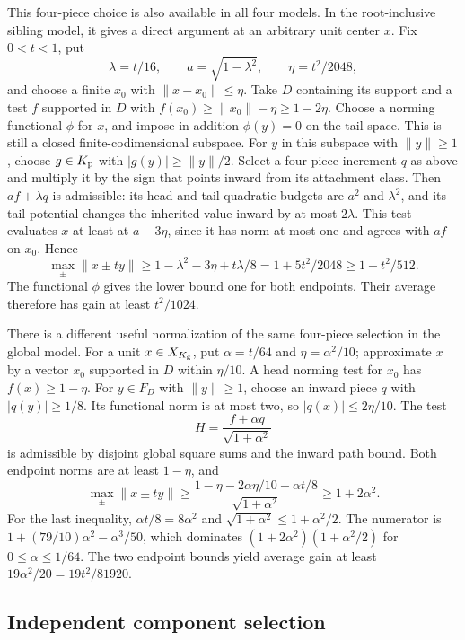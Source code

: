 This four-piece choice is also available in all four models. In the
root-inclusive sibling model, it gives a direct argument at
an arbitrary unit center $x$. Fix $0<t<1$, put
\[
 \lambda=t/16,\qquad a=\sqrt{1-\lambda^2},\qquad
 \eta=t^2/2048,
\]
and choose a finite $x_0$ with $\|x-x_0\|\le\eta$.
Take $D$ containing its support and a test $f$ supported in $D$ with
$f(x_0)\ge\|x_0\|-\eta\ge1-2\eta$.
Choose a norming functional $\phi$ for $x$, and impose in addition
$\phi(y)=0$ on the tail space. This is still a closed
finite-codimensional subspace. For $y$ in this subspace with $\|y\|\ge1$,
choose $g\in K_{\rm p}$ with $|g(y)|\ge\|y\|/2$. Select a four-piece increment $q$ as
above and multiply it by the sign that points inward from its
attachment class. Then $a f+\lambda q$ is admissible: its head and
tail quadratic budgets are $a^2$ and $\lambda^2$, and its tail
potential changes the inherited value inward by at most $2\lambda$.
This test evaluates $x$ at least at $a-3\eta$, since it has norm at
most one and agrees with $af$ on $x_0$. Hence
\[
 \max_{\pm}\|x\pm ty\|
 \ge 1-\lambda^2-3\eta+t\lambda/8
 =1+5t^2/2048\ge1+t^2/512.
\]
The functional $\phi$ gives the lower bound one for both endpoints.
Their average therefore has gain at least $t^2/1024$.

There is a different useful normalization of the same four-piece
selection in the global model. For a unit $x\in X_{K_{\rm g}}$, put
$\alpha=t/64$ and $\eta=\alpha^2/10$; approximate $x$ by a vector
$x_0$ supported in $D$ within $\eta/10$. A head norming test for
$x_0$ has $f(x)\ge1-\eta$. For $y\in F_D$ with $\|y\|\ge1$, choose an inward piece $q$ with
$|q(y)|\ge1/8$. Its functional norm is at most two, so
$|q(x)|\le2\eta/10$. The test
\[
 H=\frac{f+\alpha q}{\sqrt{1+\alpha^2}}
\]
is admissible by disjoint global square sums and the inward path
bound. Both endpoint norms are at least $1-\eta$, and
\begin{equation}\label{eq:global-four-piece-estimate}
 \max_{\pm}\|x\pm ty\|
 \ge\frac{1-\eta-2\alpha\eta/10+\alpha t/8}
              {\sqrt{1+\alpha^2}}
 \ge1+2\alpha^2.
\end{equation}
For the last inequality, $\alpha t/8=8\alpha^2$ and
$\sqrt{1+\alpha^2}\le1+\alpha^2/2$. The numerator is
$1+(79/10)\alpha^2-\alpha^3/50$, which dominates
$(1+2\alpha^2)(1+\alpha^2/2)$ for $0\le\alpha\le1/64$.
The two endpoint bounds yield average gain at least
$19\alpha^2/20=19t^2/81920$.

\subsection{Independent component selection}
\label{sec:component-selection}


